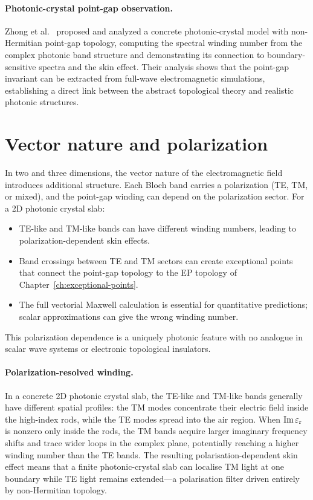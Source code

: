 \paragraph{Photonic-crystal point-gap observation.}
Zhong et al.~\cite{zhong2021non} proposed and analyzed a concrete
photonic-crystal model with non-Hermitian point-gap topology, computing
the spectral winding number from the complex photonic band structure and
demonstrating its connection to boundary-sensitive spectra and the skin
effect. Their analysis shows that the point-gap invariant can be
extracted from full-wave electromagnetic simulations, establishing a
direct link between the abstract topological theory and realistic
photonic structures.


\section{Vector nature and polarization}
\label{sec:vector-point-gap}

In two and three dimensions, the vector nature of the electromagnetic
field introduces additional structure. Each Bloch band carries a
polarization (TE, TM, or mixed), and the point-gap winding can depend on
the polarization sector. For a 2D photonic crystal slab:
\begin{itemize}
 \item TE-like and TM-like bands can have different winding numbers,
 leading to polarization-dependent skin effects.
 \item Band crossings between TE and TM sectors can create exceptional
 points that connect the point-gap topology to the EP topology of
 Chapter~\ref{ch:exceptional-points}.
 \item The full vectorial Maxwell calculation is essential for
 quantitative predictions; scalar approximations can give the wrong
 winding number.
\end{itemize}

This polarization dependence is a uniquely photonic feature with no
analogue in scalar wave systems or electronic topological insulators.

\paragraph{Polarization-resolved winding.}
In a concrete 2D photonic crystal slab, the TE-like and TM-like bands
generally have different spatial profiles: the TM modes concentrate their
electric field inside the high-index rods, while the TE modes spread
into the air region. When $\operatorname{Im}\varepsilon_{\mathrm{r}}$ is nonzero only inside the rods,
the TM bands acquire larger imaginary frequency shifts and trace wider
loops in the complex plane, potentially reaching a higher winding number
than the TE bands. The resulting polarisation-dependent skin effect
means that a finite photonic-crystal slab can localise TM light at one
boundary while TE light remains extended---a polarisation filter driven
entirely by non-Hermitian topology.

